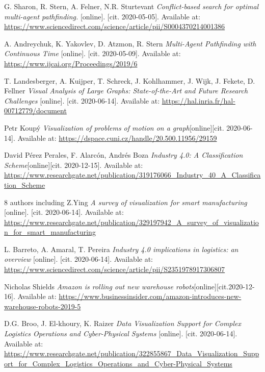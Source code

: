 \documentclass[thesis=B,english]{FITthesis}[2019/12/23]
\begin{document}
\begin{thebibliography}{10}

G. Sharon, R. Stern, A. Felner, N.R. Sturtevant \textit{Conflict-based search for optimal multi-agent pathfinding.} [online]. [cit. 2020-05-05]. Available at: \url{https://www.sciencedirect.com/science/article/pii/S0004370214001386}

A. Andreychuk, K. Yakovlev, D. Atzmon, R. Stern \textit{Multi-Agent Pathfinding with Continuous Time} [online]. [cit. 2020-05-09]. Available at: \url{https://www.ijcai.org/Proceedings/2019/6}

T. Landesberger, A. Kuijper, T. Schreck, J. Kohlhammer,
J. Wijk, J. Fekete, D. Fellner  \textit{Visual Analysis of Large Graphs: State-of-the-Art and Future Research Challenges} [online]. [cit. 2020-06-14]. Available at: \url{https://hal.inria.fr/hal-00712779/document}

Petr Koupý \textit{Visualization of problems of motion on a graph}[online][cit. 2020-06-14]. Available at: \url{https://dspace.cuni.cz/handle/20.500.11956/29159}

David Pérez Perales, F. Alarcón, Andrés Boza \textit{Industry 4.0: A Classification Scheme}[online][cit. 2020-12-15]. Available at: \url{https://www.researchgate.net/publication/319176066_Industry_40_A_Classification_Scheme} 


8 authors including Z.Ying \textit{A survey of visualization for smart manufacturing} [online]. [cit. 2020-06-14]. Available at: \url{https://www.researchgate.net/publication/329197942_A_survey_of_visualization_for_smart_manufacturing}

L. Barreto, A. Amaral, T. Pereira \textit{Industry 4.0 implications in logistics: an overview} [online]. [cit. 2020-06-14]. Available at: \url{https://www.sciencedirect.com/science/article/pii/S2351978917306807}

Nicholas Shields \textit{Amazon is rolling out new warehouse robots}[online][cit.2020-12-16]. Available at: \url{https://www.businessinsider.com/amazon-introduces-new-warehouse-robots-2019-5}

D.G. Broo, J. El-khoury, K. Raizer \textit{Data Visualization Support for Complex Logistics Operations and Cyber-Physical Systems} [online]. [cit. 2020-06-14]. Available at: \url{https://www.researchgate.net/publication/322855867_Data_Visualization_Support_for_Complex_Logistics_Operations_and_Cyber-Physical_Systems}


\end{thebibliography}
\end{document}
